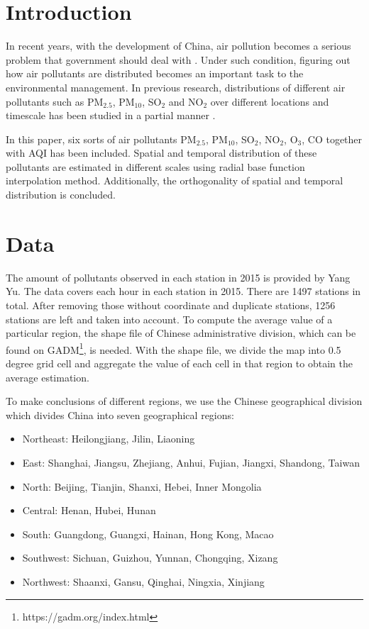 \documentclass[letterpaper]{article}
\begin{document}
\begin{CJK*}{UTF8}{gkai}
  \section{Introduction}
  In recent years, with the development of China, air pollution becomes a serious problem that government should deal with . Under such condition, figuring out how air pollutants are distributed becomes an important task to the environmental management. In previous research, distributions of different air pollutants such as PM$_{2.5}$, PM$_{10}$, SO$_{2}$ and NO$_{2}$ over different locations and timescale has been studied in a partial manner .

  In this paper, six sorts of air pollutants PM$_{2.5}$, PM$_{10}$, SO$_{2}$, NO$_{2}$, O$_{3}$, CO together with AQI has been included. Spatial and temporal distribution of these pollutants are estimated in different scales using radial base function interpolation method. Additionally, the orthogonality of spatial and temporal distribution is concluded.

  \section{Data}

  The amount of pollutants observed in each station in 2015 is provided by Yang Yu. The data covers each hour in each station in 2015. There are 1497 stations in total. After removing those without coordinate and duplicate stations, 1256 stations are left and taken into account. To compute the average value of a particular region, the shape file of Chinese administrative division, which can be found on GADM\footnote{https://gadm.org/index.html}, is needed. With the shape file, we divide the map into 0.5 degree grid cell and aggregate the value of each cell in that region to obtain the average estimation.

  To make conclusions of different regions, we use the Chinese geographical division which divides China into seven geographical regions:
  \begin{itemize}
  \item Northeast: Heilongjiang, Jilin, Liaoning
  \item East: Shanghai, Jiangsu, Zhejiang, Anhui, Fujian, Jiangxi, Shandong, Taiwan
  \item North: Beijing, Tianjin, Shanxi, Hebei, Inner Mongolia
  \item Central: Henan, Hubei, Hunan
  \item South: Guangdong, Guangxi, Hainan, Hong Kong, Macao
  \item Southwest: Sichuan, Guizhou, Yunnan, Chongqing, Xizang
  \item Northwest: Shaanxi, Gansu, Qinghai, Ningxia, Xinjiang
  \end{itemize}


\end{CJK*}
\end{document}
